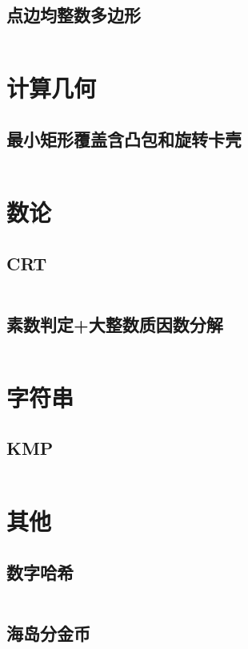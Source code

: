 \documentclass{article}
\begin{document}
\subsection{点边均整数多边形}
\inputminted[breaklines]{c++}{../构造/点边均整数多边形.cpp}

\newpage
\section{计算几何}
\subsection{最小矩形覆盖含凸包和旋转卡壳}
\inputminted[breaklines]{c++}{../计算几何/最小矩形覆盖含凸包和旋转卡壳.cpp}

\newpage
\section{数论}
\subsection{CRT}
\inputminted[breaklines]{c++}{../数论/CRT.cpp}

\subsection{素数判定+大整数质因数分解}
\inputminted[breaklines]{c++}{../数论/素数判定+大整数质因数分解.cpp}

\newpage
\section{字符串}
\subsection{KMP}
\inputminted[breaklines]{c++}{../字符串/KMP.cpp}

\newpage
\section{其他}
\subsection{数字哈希}
\inputminted[breaklines]{c++}{../其他/数字哈希.cpp}

\subsection{海岛分金币}
\end{document}
